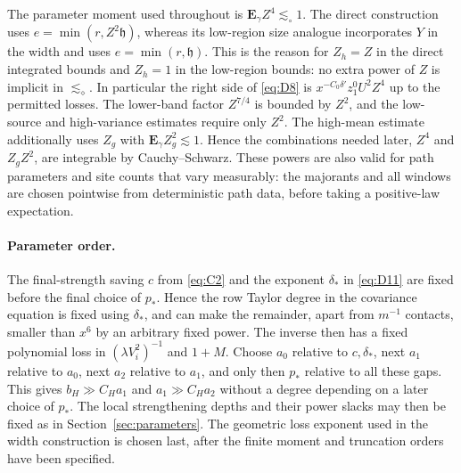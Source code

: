 \begin{remark}\label{rem:statistics-majorants}
The parameter moment used throughout is $\mathbf E_\gamma Z^4\lesssim_\circ1$.
The direct construction uses $e=\min(r,Z^2\mathfrak h)$, whereas its
low-region size analogue incorporates $Y$ in the width and uses
$e=\min(r,\mathfrak h)$.  This is the reason for $Z_h=Z$ in the direct
integrated bounds and $Z_h=1$ in the low-region bounds: no extra power
of $Z$ is implicit in $\lesssim_\diamond$.  In particular the right side
of \eqref{eq:D8} is $x^{-C_0\delta'}z_1^0 U^2Z^4$ up to the permitted
losses.  The lower-band factor $Z^{7/4}$ is bounded by $Z^2$, and the
low-source and high-variance estimates require only $Z^2$.
The high-mean estimate additionally uses $Z_g$ with
$\mathbf E_\gamma Z_g^2\lesssim1$.  Hence the combinations needed later,
$Z^4$ and $Z_gZ^2$, are integrable by Cauchy--Schwarz.  These powers are
also valid for path parameters and site counts that vary measurably:
the majorants and all windows are chosen pointwise from deterministic
path data, before taking a positive-law expectation.
\end{remark}

\paragraph{Parameter order.}
The final-strength saving $c$ from \eqref{eq:C2} and the exponent $\delta_*$ in
\eqref{eq:D11} are fixed before the final choice of $p_*$.  Hence the row Taylor
degree in the covariance equation is fixed using $\delta_*$, and can
make the remainder, apart from $m^{-1}$ contacts, smaller than $x^6$ by
an arbitrary fixed power.  The inverse then has a fixed polynomial loss
in $(\lambda V_i^2)^{-1}$ and $1+M$.  Choose $a_0$ relative to
$c,\delta_*$, next $a_1$ relative to $a_0$, next $a_2$ relative to $a_1$,
and only then $p_*$ relative to all these gaps.  This gives
$b_H\gg C_Ha_1$ and $a_1\gg C_Ha_2$ without a degree depending on a later
choice of $p_*$.  The local strengthening depths and their power slacks
may then be fixed as in Section~\ref{sec:parameters}.  The geometric
loss exponent used in the width construction is chosen last, after the
finite moment and truncation orders have been specified.
